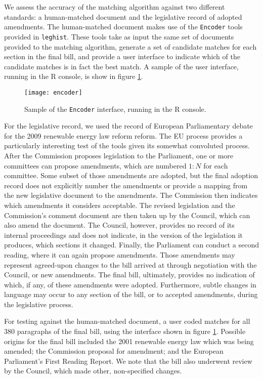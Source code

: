 \documentclass[11pt]{article}
\begin{document}
We assess the accuracy of the matching algorithm against two different
standards: a human-matched document and the legislative record of
adopted amendments. The human-matched document makes use of the
\texttt{Encoder} tools provided in \texttt{leghist}. These tools take
as input the same set of documents provided to the matching algorithm,
generate a set of candidate matches for each section in the final
bill, and provide a user interface to indicate which of the candidate
matches is in fact the best match. A sample of the user interface,
running in the R console, is show in figure \ref{fig:encoder-interface}.

\begin{figure}[ht]
  \centering
  \texttt{[image: encoder]}
  \caption{Sample of the \texttt{Encoder} interface, running in the R console. }
  \label{fig:encoder-interface}
\end{figure}

For the legislative record, we used the record of European
Parliamentary debate for the 2009 renewable energy law reform reform. The EU process
provides a particularly interesting test of the tools given its
somewhat convoluted process. After the Commission proposes legislation
to the Parliament, one or more committees can propose amendments,
which are numbered $1:N$ for each committee. Some subset of those
amendments are adopted, but the final adoption record does not
explicitly number the amendments or provide a mapping from the new
legislative document to the amendments. The Commission then indicates
which amendments it considers acceptable. The revised legislation and
the Commission's comment document are then taken up by the Council,
which can also amend the document. The Council, however, provides no
record of its internal proceedings and does not indicate, in the
version of the legislation it produces, which sections it
changed. Finally, the Parliament can conduct a second reading, where
it can again propose amendments. Those amendments may represent
agreed-upon changes to the bill arrived at through negotiation with
the Council, or new amendments. The final bill, ultimately, provides
no indication of which, if any, of these amendments were
adopted. Furthermore, subtle changes in language may occur to any
section of the bill, or to accepted amendments, during the legislative
process. 

For testing against the human-matched document, a user coded matches
for all 380 paragraphs of the final bill, using the interface shown in
figure \ref{fig:encoder-interface}. Possible origins for the final
bill included the 2001 renewable energy law which was being amended;
the Commission proposal for amendment; and the European Parliament's
First Reading Report. We note that the bill also underwent review by
the Council, which made other, non-specified changes. 
\end{document}
